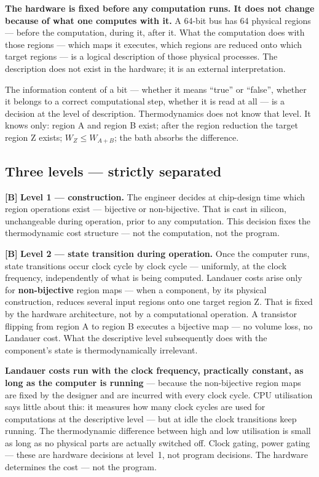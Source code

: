 \textbf{The hardware is fixed before any computation runs. It does not change
because of what one computes with it.} A 64-bit bus has 64 physical regions ---
before the computation, during it, after it. What the computation does with those
regions --- which maps it executes, which regions are reduced onto which target
regions --- is a logical description of those physical processes. The description
does not exist in the hardware; it is an external interpretation.

The information content of a bit --- whether it means “true” or “false”, whether
it belongs to a correct computational step, whether it is read at all --- is a
decision at the level of description. Thermodynamics does not know that level. It
knows only: region A and region B exist; after the region reduction the target
region Z exists; $W_Z \le W_{A+B}$; the bath absorbs the difference.

\subsection{Three levels --- strictly separated}

\textbf{[B]} \textbf{Level 1 --- construction.} The engineer decides at chip-design time
which region operations exist --- bijective or non-bijective. That is cast in
silicon, unchangeable during operation, prior to any computation. This decision
fixes the thermodynamic cost structure --- not the computation, not the program.

\textbf{[B]} \textbf{Level 2 --- state transition during operation.} Once the computer
runs, state transitions occur clock cycle by clock cycle --- uniformly, at the
clock frequency, independently of what is being computed. Landauer costs arise
only for \textbf{non-bijective} region maps --- when a component, by its physical
construction, reduces several input regions onto one target region Z. That is
fixed by the hardware architecture, not by a computational operation. A transistor
flipping from region A to region B executes a bijective map --- no volume loss, no
Landauer cost. What the descriptive level subsequently does with the component's
state is thermodynamically irrelevant.

\textbf{Landauer costs run with the clock frequency, practically constant, as long
as the computer is running} --- because the non-bijective region maps are fixed by
the designer and are incurred with every clock cycle. CPU utilisation says little
about this: it measures how many clock cycles are used for computations at the
descriptive level --- but at idle the clock transitions keep running. The
thermodynamic difference between high and low utilisation is small as long as no
physical parts are actually switched off. Clock gating, power gating --- these are
hardware decisions at level~1, not program decisions. The hardware determines the
cost --- not the program.

